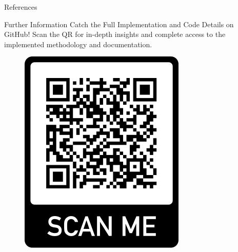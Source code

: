\documentclass[final, 12pt]{beamer}
\newlength{\sepwidth}
\newlength{\colwidth}
\newlength{\smallcolwidth}
\newcommand{\separatorcolumn}{\begin{column}{\sepwidth}\end{column}}
\begin{document}
\begin{frame}[t]
\begin{columns}[t]
\begin{column}{\smallcolwidth}
\begin{block}{References}
        \nocite{*}
        \footnotesize{}
    \end{block}

    \begin{block}{Further Information}
        Catch the Full Implementation and Code Details on GitHub! Scan the QR for in-depth insights and complete access to the implemented methodology and documentation.
        \begin{figure}
            \centering
            \includegraphics[scale=0.9]{figures/frame.png}
        \end{figure}
    \end{block}

\end{column}

\separatorcolumn
\end{columns}
\end{frame}
\end{document}
